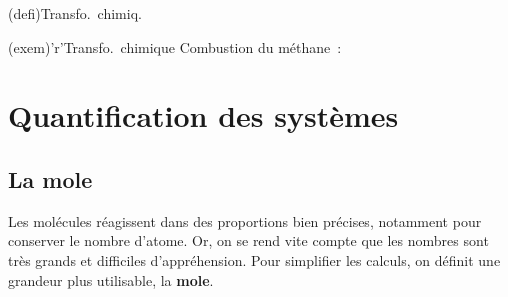 \documentclass[../../main/main.tex]{subfiles}
\begin{document}
\begin{tcbraster}[raster columns=2, raster equal height=rows]
	\begin{tcb}[label=def:transnuc,
			list entry={\lte\thedefi~:~Transformations chimiques}
		](defi){Transfo.\ chimiq.}
	\end{tcb}
	\begin{tcb}[label=exem:transnuc,
			list entry={\lte\theexem~:~Transformations chimiques}
		](exem)'r'{Transfo.\ chimique}
		Combustion du méthane~:
		\psw{%
			\[
				\ce{CH4\gaz{} + 2O2\gaz{} = CO2\gaz{} + 2H2O\gaz{}}
			\]
		}%
	\end{tcb}
\end{tcbraster}

\section{Quantification des systèmes}
\subsection{La mole}

Les molécules réagissent dans des proportions bien précises, notamment pour
conserver le nombre d'atome.
Or, on se
rend vite compte que les nombres sont très grands et difficiles d'appréhension.
Pour simplifier les calculs, on définit une grandeur plus utilisable, la
\textbf{mole}.
\end{document}
